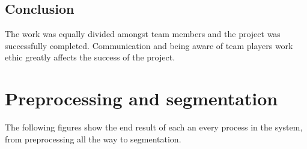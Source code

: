 \documentclass[10pt,twocolumn]{witseiepaper}
\begin{document}
\subsection{\textbf{Conclusion}}
The work was equally divided amongst team members and the project was successfully completed. Communication and being aware of team players work ethic greatly affects the success of the project.










\twocolumn
\section{Preprocessing and segmentation}
\label{app:pre}
The following figures show the end result of each an every process in the system, from preprocessing all the way to segmentation.
\end{document}
